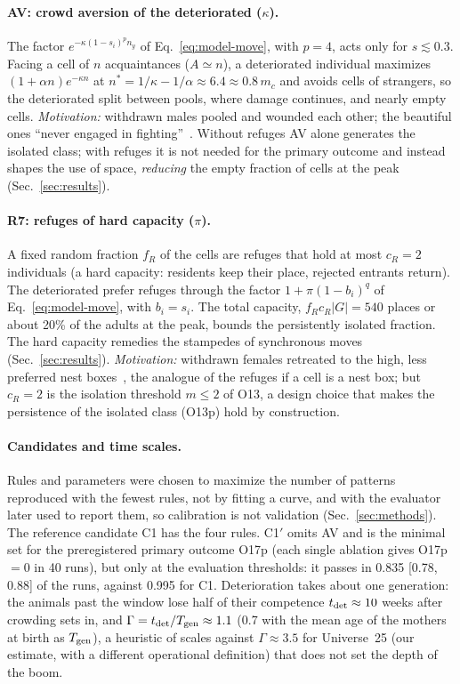 \paragraph*{AV: crowd aversion of the deteriorated ($\kappa$).}
The factor $e^{-\kappa(1-s_i)^{p}n_y}$ of Eq.~\eqref{eq:model-move}, with $p=4$, acts only for $s\lesssim0.3$.
Facing a cell of $n$ acquaintances ($A\simeq n$), a deteriorated individual maximizes $(1+\alpha n)e^{-\kappa n}$ at
$n^*=1/\kappa-1/\alpha\approx6.4\approx0.8\,m_c$ and avoids cells of strangers, so the deteriorated split between
pools, where damage continues, and nearly empty cells. \emph{Motivation:} withdrawn males pooled and wounded each other; the beautiful ones ``never engaged in
fighting''~\cite{Calhoun1973}. Without refuges AV alone generates the isolated class; with refuges it is not needed for
the primary outcome and instead shapes the use of space, \emph{reducing} the empty fraction of cells at the peak
(Sec.~\ref{sec:results}).

\paragraph*{R7: refuges of hard capacity ($\pi$).}
A fixed random fraction $f_R$ of the cells are refuges that hold at most $c_R=2$ individuals (a hard capacity:
residents keep their place, rejected entrants return). The deteriorated prefer refuges through the factor $1+\pi(1-b_i)^{q}$ of Eq.~\eqref{eq:model-move}, with $b_i=s_i$. The total capacity,
$f_Rc_R|G|=540$ places or about 20\% of the adults at the peak, bounds the persistently isolated fraction. The hard
capacity remedies the stampedes of synchronous moves (Sec.~\ref{sec:results}). \emph{Motivation:} withdrawn females retreated to the high, less preferred nest
boxes~\cite{Calhoun1973}, the analogue of the refuges if a cell is a nest box; but $c_R=2$ is the isolation threshold
$m\le2$ of O13, a design choice that makes the persistence of the isolated class (O13p) hold by construction.

\paragraph*{Candidates and time scales.}
\label{sec:model-candidates}
Rules and parameters were chosen to maximize the number of patterns reproduced with the fewest rules, not by fitting a curve,
and with the evaluator later used to report them, so calibration is not validation (Sec.~\ref{sec:methods}). The reference candidate \textsf{C1} has the four rules. \textsf{C1$'$} omits AV
and is the minimal set for the preregistered primary outcome O17p (each single ablation gives O17p $=0$ in 40 runs),
but only at the evaluation thresholds: it passes in 0.835 [0.78, 0.88] of the runs, against 0.995 for \textsf{C1}.
Deterioration takes about one
generation: the animals past the window lose half of their competence $t_{\rm det}\approx10$ weeks after crowding sets
in, and $\Gamma=t_{\rm det}/T_{\rm gen}\approx1.1$ (0.7 with the mean age of the mothers at birth as $T_{\rm gen}$), a
heuristic of scales against $\Gamma\approx3.5$ for Universe~25 (our estimate, with a different operational
definition) that does not set the depth of the boom.

